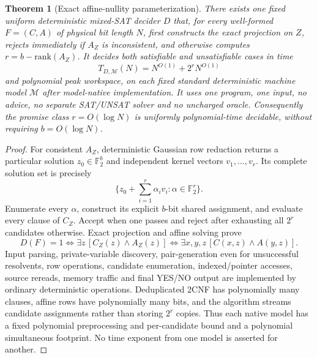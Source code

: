 \documentclass[11pt]{article}
\newtheorem{theorem}{Theorem}
\begin{document}
\begin{theorem}[Exact affine-nullity parameterization]
There exists one fixed uniform deterministic mixed-SAT decider $D$ that, for every well-formed $F=(C,A)$ of physical bit length $N$, first constructs the exact projection on $Z$, rejects immediately if $A_Z$ is inconsistent, and otherwise computes $r=b-\mathrm{rank}(A_Z)$. It decides both satisfiable and unsatisfiable cases in time
\[
 T_{D,\mathcal M}(N)=N^{O(1)}+2^r N^{O(1)}
\]
and polynomial peak workspace, on each fixed standard deterministic machine model $\mathcal M$ after model-native implementation. It uses one program, one input, no advice, no separate SAT/UNSAT solver and no uncharged oracle. Consequently the promise class $r=O(\log N)$ is uniformly polynomial-time decidable, without requiring $b=O(\log N)$.
\end{theorem}
\begin{proof}
For consistent $A_Z$, deterministic Gaussian row reduction returns a particular solution $z_0\in\mathbb F_2^b$ and independent kernel vectors $v_1,\ldots,v_r$. Its complete solution set is precisely
\[
 \bigl\{z_0+\textstyle\sum_{i=1}^{r}\alpha_i v_i:\alpha\in\mathbb F_2^r\bigr\}.
\]
Enumerate every $\alpha$, construct its explicit $b$-bit shared assignment, and evaluate every clause of $C_Z$. Accept when one passes and reject after exhausting all $2^r$ candidates otherwise. Exact projection and affine solving prove
\[
 D(F)=1\iff\exists z\,[C_Z(z)\wedge A_Z(z)]\iff\exists x,y,z\,[C(x,z)\wedge A(y,z)].
\]
Input parsing, private-variable discovery, pair-generation even for unsuccessful resolvents, row operations, candidate enumeration, indexed/pointer accesses, source rereads, memory traffic and final YES/NO output are implemented by ordinary deterministic operations. Deduplicated 2CNF has polynomially many clauses, affine rows have polynomially many bits, and the algorithm streams candidate assignments rather than storing $2^r$ copies. Thus each native model has a fixed polynomial preprocessing and per-candidate bound and a polynomial simultaneous footprint. No time exponent from one model is asserted for another.\end{proof}
\end{document}
